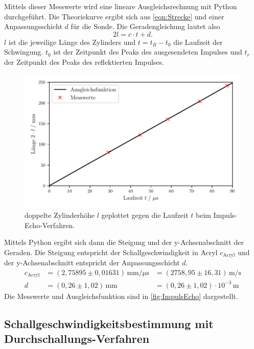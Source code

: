   Mittels dieser Messwerte wird eine lineare Ausgleichsrechnung mit Python durchgeführt. Die Theoriekurve ergibt sich aus
  \autoref{eqn:Strecke} und einer Anpassungsschicht $d$ für die Sonde. Die Geradengleichung lautet also
  \begin{equation*}
    2l = c \cdot t + d.
  \end{equation*}
  $l$ ist die jeweilige Länge des Zylinders und $t = t_R - t_0$ die Laufzeit der Schwingung. $t_0$ ist der Zeitpunkt
  des Peaks des ausgesendeten Impulses und $t_r$ der Zeitpunkt des Peaks des reflektierten Impulses.\\
  \begin{figure}
    \centering
    \includegraphics[width=15cm]{messwerte/ImpulsEcho.pdf}
    \caption{doppelte Zylinderhöhe $l$ geplottet gegen die Laufzeit $t$ beim Impuls-Echo-Verfahren.}
    \label{fig:ImpulsEcho}
  \end{figure}
  Mittels Python ergibt sich dann die Steigung und der y-Achsenabschnitt der Geraden. Die Steigung entspricht
  der Schallgeschwindigkeit in Acryl $c_{\mathrm{Acryl}}$ und der y-Achsenabschnitt entspricht der Anpassungsschicht $d$.\\
  \begin{align*}
    c_{\mathrm{Acryl}} &= (2,75895 \pm 0,01631) \, \si{\milli\meter\per\micro\second} &= (2758,95 \pm 16,31) \, \si{\meter\per\second} \\
    d &= (0,26 \pm 1,02) \, \si{\milli\meter} &= (0,26 \pm 1,02) \cdot 10^{-3} \, \si{\meter}
  \end{align*}
  Die Messwerte und Ausgleichsfunktion sind in \autoref{fig:ImpulsEcho} dargestellt.

\subsection{Schallgeschwindigkeitsbestimmung mit Durchschallungs-Verfahren}

